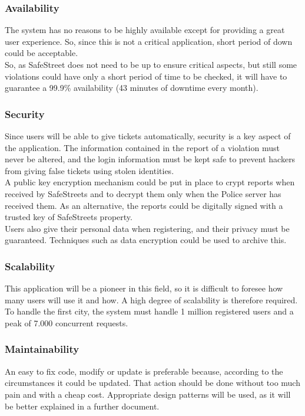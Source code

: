 \subsubsection{Availability}
	The system has no reasons to be highly available except for providing a great
user experience. So, since this is not a critical application, short period of
down could be acceptable.\\
	So, as SafeStreet does not need to be up to ensure critical aspects, but still some violations could have only a short period of time to be checked, it will have to guarantee a 99.9\% availability (43 minutes of downtime every month).

\subsubsection{Security}
    Since users will be able to give tickets automatically, security is a key aspect of the application.
    The information contained in the report of a violation must never be altered, and the login information
    must be kept safe to prevent hackers from giving false tickets using stolen identities.\\
    A public key encryption mechanism could be put in place to crypt reports when received by SafeStreets and to decrypt them only when the Police server has received them. As an alternative, the reports could be digitally signed with a trusted key of SafeStreets property.\\
  	Users also give their personal data when registering, and their privacy must be guaranteed. Techniques such as data encryption could be used to archive this.

\subsubsection{Scalability}
    This application will be a pioneer in this field, so it is difficult to foresee how many users will
    use it and how. A high degree of scalability is therefore required. To handle the first city,
    the system must handle 1 million registered users and a peak of 7.000 concurrent requests.
    
\subsubsection{Maintainability}
	An easy	to	fix	code, modify or update is preferable because,	according	to	the	circumstances it could be updated. That action should be done without too much pain and with a cheap cost.		
	Appropriate	design	patterns	will	be	used,	as	it	will	be	better	explained	in	a	further	document.    
	

